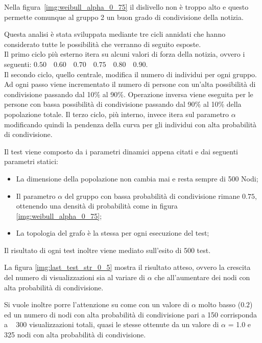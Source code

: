 Nella figura~\ref{img:weibull_alpha_0_75} il dislivello non è troppo alto e questo permette 
comunque al gruppo 2 un buon grado di condivisione della notizia.

Questa analisi è stata sviluppata mediante tre cicli annidati che hanno considerato tutte le 
possibilità che verranno di seguito esposte.\\
Il primo ciclo più esterno itera su alcuni valori di forza della notizia, 
ovvero i seguenti: $0.50 \quad 0.60 \quad 0.70 \quad 0.75 \quad 0.80 \quad 0.90$.\\
Il secondo ciclo, quello centrale, modifica il numero di individui per ogni gruppo. 
Ad ogni passo viene incrementato il numero di persone con un'alta possibilità di condivisione 
passando dal 10\% al 90\%. Operazione inversa viene eseguita per le persone con bassa possibilità di 
condivisione passando dal 90\% al 10\% della popolazione totale.
Il terzo ciclo, più interno, invece itera sul parametro $\alpha$ modificando quindi la pendenza della 
curva per gli individui con alta probabilità di condivisione.

Il test viene composto da i parametri dinamici appena citati e dai seguenti parametri statici:
\begin{itemize}
\item La dimensione della popolazione non cambia mai e resta sempre di 500 Nodi;
\item Il parametro $\alpha$ del gruppo con bassa probabilità di condivisione rimane $0.75$, 
ottenendo una densità di probabilità come in figura \ref{img:weibull_alpha_0_75};
\item La topologia del grafo è la stessa per ogni esecuzione del test;
\end{itemize}

Il risultato di ogni test inoltre viene mediato sull'esito di 500 test.

La figura \ref{img:last_test_str_0_5} mostra il risultato atteso, 
ovvero la crescita del numero di visualizzazioni sia al variare di $\alpha$ che all'aumentare 
dei nodi con alta probabilità di condivisione.

Si vuole inoltre porre l'attenzione su come con un valore di $\alpha$ 
molto basso ($0.2$) ed un numero di nodi con alta probabilità di condivisione pari a 150 corrisponda 
a ~ 300 visualizzazioni totali, quasi le stesse ottenute da un valore di $\alpha$ = 1.0 e 325 nodi con 
alta probabilità di condivisione.




